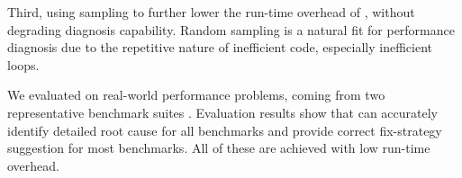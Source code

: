 Third, using sampling to further lower the run-time overhead of \Tool, without
degrading diagnosis capability. Random sampling is a natural fit for performance
diagnosis due to the repetitive nature of inefficient code, especially
inefficient loops.

We evaluated \Tool on \allbugs real-world performance problems,
coming from two representative benchmark suites 
\cite{SongOOPSLA2014,Alabama}. 
Evaluation results show that \Tool can accurately identify detailed
root cause for all benchmarks and provide correct fix-strategy suggestion for
most benchmarks. All of these are achieved with low run-time overhead.
